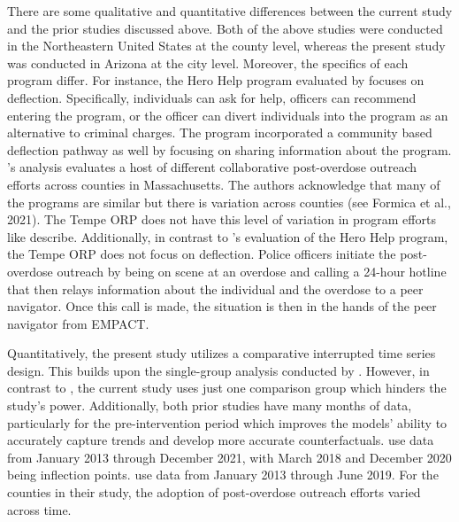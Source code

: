 There are some qualitative and quantitative differences between the current study and the prior studies discussed above. Both of the above studies were conducted in the Northeastern United States at the county level, whereas the present study was conducted in Arizona at the city level. Moreover, the specifics of each program differ. For instance, the Hero Help program evaluated by \textcite{donnelly_law_2022} focuses on deflection. Specifically, individuals can ask for help, officers can recommend entering the program, or the officer can divert individuals into the program as an alternative to criminal charges. The program incorporated a community based deflection pathway as well by focusing on sharing information about the program. \textcite{xuan_association_2023}'s analysis evaluates a host of different collaborative post-overdose outreach efforts across counties in Massachusetts. The authors acknowledge that many of the programs are similar but there is variation across counties (see Formica et al., 2021). The Tempe ORP does not have this level of variation in program efforts like \textcite{xuan_association_2023} describe. Additionally, in contrast to \textcite{donnelly_law_2022}'s evaluation of the Hero Help program, the Tempe ORP does not focus on deflection. Police officers initiate the post-overdose outreach by being on scene at an overdose and calling a 24-hour hotline that then relays information about the individual and the overdose to a peer navigator. Once this call is made, the situation is then in the hands of the peer navigator from EMPACT. 

Quantitatively, the present study utilizes a comparative interrupted time series design. This builds upon the single-group analysis conducted by \textcite{donnelly_law_2022}. However, in contrast to \textcite{xuan_association_2023}, the current study uses just one comparison group which hinders the study's power. Additionally, both prior studies have many months of data, particularly for the pre-intervention period which improves the models' ability to accurately capture trends and develop more accurate counterfactuals. \textcite{donnelly_law_2022} use data from January 2013 through December 2021, with March 2018 and December 2020 being inflection points. \textcite{xuan_association_2023} use data from January 2013 through June 2019. For the counties in their study, the adoption of post-overdose outreach efforts varied across time.

